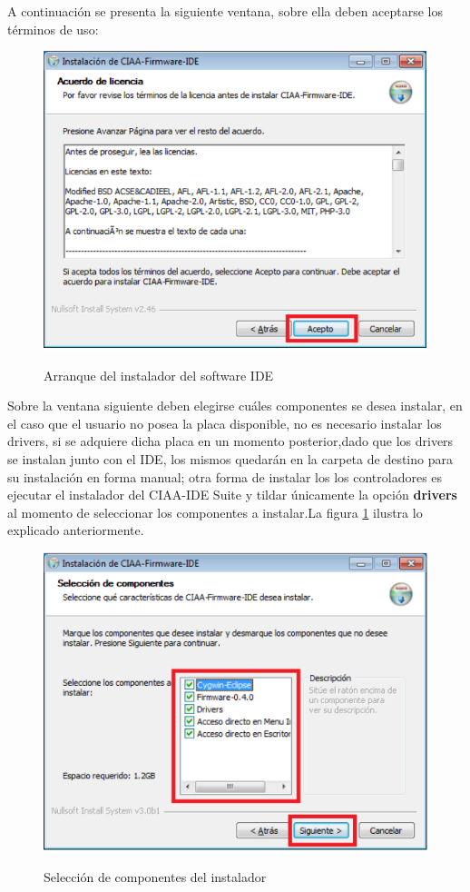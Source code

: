 \documentclass[12pt,letterpaper]{article}
\begin{document}
A continuación se presenta la siguiente ventana, sobre ella deben aceptarse los términos de uso:

\begin{figure}[!h]
\centering
\includegraphics[width=8 cm]{figuras/instalacion2.png}\\
\caption{Arranque del instalador del software IDE}
\label{Fig5}
\end{figure}


Sobre la ventana siguiente deben elegirse cuáles componentes se desea instalar, en el caso que el usuario no posea  la placa disponible, no es necesario instalar los drivers, si se adquiere dicha placa en un momento posterior,dado que los drivers se instalan junto con el IDE, los mismos quedarán en la carpeta de destino para su instalación en forma manual; otra forma de instalar los  los controladores es ejecutar el instalador del CIAA-IDE Suite y tildar únicamente la opción \textbf{drivers} al momento de seleccionar los componentes a instalar.La figura \ref{Fig5} ilustra lo explicado anteriormente.

\begin{figure}[!h]
\centering
\includegraphics[width=8 cm]{figuras/instalacion3.png}\\
\caption{Selección de componentes del instalador}
\label{Fig6}
\end{figure}
\end{document}
